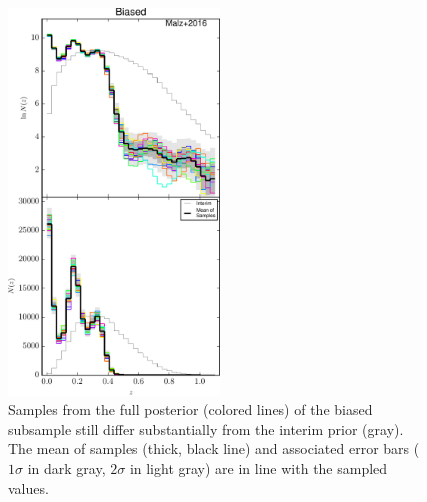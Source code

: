 \begin{figure}
	\includegraphics[width=0.5\textwidth]{figures/chippr/bias_samps.pdf}
	\caption{Samples from the full posterior (colored lines) of the biased subsample still differ substantially from the interim prior (gray).  
		The mean of samples (thick, black line) and associated error bars ($1\sigma$ in dark gray, $2\sigma$ in light gray) are in line with the sampled values.}
\end{figure}

